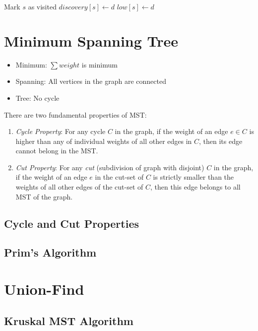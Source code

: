 \noindent \hrulefill
\begin{algorithmic}[1]
   
  \State Mark $s$ as visited
  \State $discovery[s] \gets d$
  \State $low[s] \gets d$
  \EndFunction
\end{algorithmic}
\noindent \hrulefill

\section{Minimum Spanning Tree}

\begin{itemize}
  \item Minimum: $\sum weight$ is minimum
  \item Spanning: All vertices in the graph are connected
  \item Tree: No cycle
\end{itemize}

There are two fundamental properties of MST:

\begin{enumerate}
  \item \textit{Cycle Property}: For any cycle $C$ in the graph, if the weight of an edge $e \in C$ is higher than any of individual weights of all other edges in $C$, then its edge cannot belong in the MST.
  \item \textit{Cut Property}: For any \textit{cut} (subdivision of graph with disjoint) $C$ in the graph, if the weight of an edge $e$ in the cut-set of $C$ is strictly smaller than the weights of all other edges of the cut-set of $C$, then this edge belongs to all MST of the graph.
\end{enumerate}

\subsection{Cycle and Cut Properties}

\subsection{Prim's Algorithm}

\section{Union-Find}

\subsection{Kruskal MST Algorithm}

